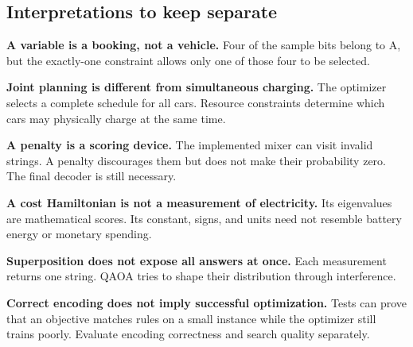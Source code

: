 \subsection{Interpretations to keep separate}
\textbf{A variable is a booking, not a vehicle.} Four of the sample bits belong
to A, but the exactly-one constraint allows only one of those four to be selected.

\textbf{Joint planning is different from simultaneous charging.} The optimizer
selects a complete schedule for all cars. Resource constraints determine which
cars may physically charge at the same time.

\textbf{A penalty is a scoring device.} The implemented mixer can visit invalid
strings. A penalty discourages them but does not make their probability zero.
The final decoder is still necessary.

\textbf{A cost Hamiltonian is not a measurement of electricity.} Its eigenvalues
are mathematical scores. Its constant, signs, and units need not resemble battery
energy or monetary spending.

\textbf{Superposition does not expose all answers at once.} Each measurement
returns one string. QAOA tries to shape their distribution through interference.

\textbf{Correct encoding does not imply successful optimization.} Tests can
prove that an objective matches rules on a small instance while the optimizer
still trains poorly. Evaluate encoding correctness and search quality separately.

